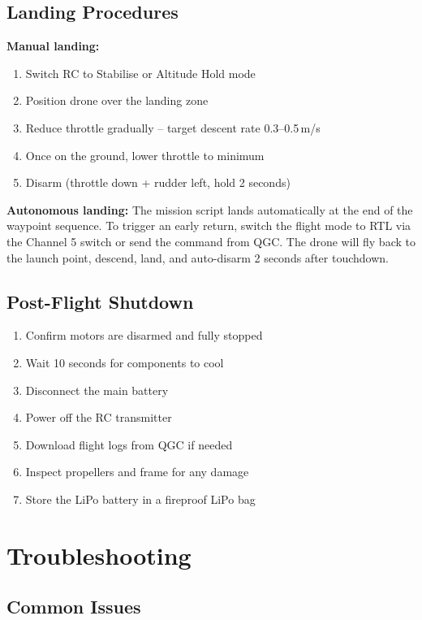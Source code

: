 \documentclass{article}
\begin{document}
\subsection{Landing Procedures}

\textbf{Manual landing:}
\begin{enumerate}
    \item Switch RC to Stabilise or Altitude Hold mode
    \item Position drone over the landing zone
    \item Reduce throttle gradually -- target descent rate 0.3--0.5\,m/s
    \item Once on the ground, lower throttle to minimum
    \item Disarm (throttle down + rudder left, hold 2 seconds)
\end{enumerate}

\textbf{Autonomous landing:}
The mission script lands automatically at the end of the waypoint sequence. To trigger an early return, switch the flight mode to RTL via the Channel 5 switch or send the command from QGC. The drone will fly back to the launch point, descend, land, and auto-disarm 2 seconds after touchdown.

\subsection{Post-Flight Shutdown}
\begin{enumerate}
    \item Confirm motors are disarmed and fully stopped
    \item Wait 10 seconds for components to cool
    \item Disconnect the main battery
    \item Power off the RC transmitter
    \item Download flight logs from QGC if needed
    \item Inspect propellers and frame for any damage
    \item Store the LiPo battery in a fireproof LiPo bag
\end{enumerate}

\section{Troubleshooting}

\subsection{Common Issues}
\end{document}
